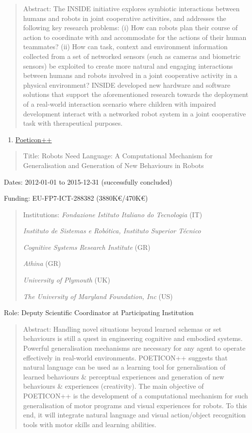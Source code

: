 \begin{quote}
Abstract: The INSIDE initiative explores symbiotic interactions between
humans and robots in joint cooperative activities, and addresses the
following key research problems: (i) How can robots plan their course of
action to coordinate with and accommodate for the actions of their human
teammates? (ii) How can task, context and environment information
collected from a set of networked sensors (such as cameras and biometric
sensors) be exploited to create more natural and engaging interactions
between humans and robots involved in a joint cooperative activity in a
physical environment? INSIDE developed new hardware and software
solutions that support the aforementioned research towards the
deployment of a real-world interaction scenario where children with
impaired development interact with a networked robot system in a joint
cooperative task with therapeutical purposes.
\end{quote}

\begin{enumerate}
\def\labelenumi{\arabic{enumi}.}
\setcounter{enumi}{7}
\item
  \ul{Poeticon++}
\end{enumerate}

\begin{quote}
Title: Robots Need Language: A Computational Mechanism for
Generalisation and Generation of New Behaviours in Robots
\end{quote}

Dates: 2012-01-01 to 2015-12-31 (successfully concluded)

Funding: EU-FP7-ICT-288382 (3880K€/470K€)

\begin{quote}
Institutions: \emph{Fondazione Istituto Italiano do Tecnologia} (IT)

\emph{Instituto de Sistemas e Robótica, Instituto Superior Técnico}

\emph{Cognitive Systems Research Institute} (GR)

\emph{Athina} (GR)

\emph{University of Plymouth} (UK)

\emph{The University of Maryland Foundation, Inc} (US)
\end{quote}

Role: Deputy Scientific Coordinator at Participating Institution

\begin{quote}
Abstract: Handling novel situations beyond learned schemas or set
behaviours is still a quest in engineering cognitive and embodied
systems. Powerful generalisation mechanisms are necessary for any agent
to operate effectively in real-world environments. POETICON++ suggests
that natural language can be used as a learning tool for generalisation
of learned behaviours \& perceptual experiences and generation of new
behaviours \& experiences (creativity). The main objective of POETICON++
is the development of a computational mechanism for such generalisation
of motor programs and visual experiences for robots. To this end, it
will integrate natural language and visual action/object recognition
tools with motor skills and learning abilities.
\end{quote}

